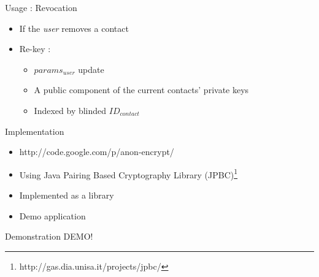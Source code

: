 \documentclass{beamer}
\begin{document}
\begin{frame}{Usage : Revocation}
\begin{itemize}
\item If the \emph{user} removes a contact
\item Re-key :
\begin{itemize}
\item $params_{user}$ update 
\item A public component of the current contacts' private keys
\item Indexed by blinded $ID_{contact}$
\end{itemize}
\end{itemize}
\end{frame}


\begin{frame}{Implementation}
\begin{itemize}
\item http://code.google.com/p/anon-encrypt/
\item Using Java Pairing Based Cryptography Library (JPBC)\footnote{http://gas.dia.unisa.it/projects/jpbc/}
\item Implemented as a library
\item Demo application
\end{itemize}
\end{frame}

\begin{frame}{Demonstration}
\Huge{DEMO!}
\end{frame}
\end{document}
